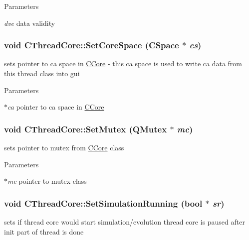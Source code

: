 \begin{DoxyParams}{Parameters}
\item[{\em dve}]data validity \end{DoxyParams}
\hypertarget{classCThreadCore_aebf817096243757f85c09221b9271c8d}{
\subsubsection[{SetCoreSpace}]{\setlength{\rightskip}{0pt plus 5cm}void CThreadCore::SetCoreSpace ({\bf CSpace} $\ast$ {\em cs})}}
\label{classCThreadCore_aebf817096243757f85c09221b9271c8d}
sets pointer to ca space in \hyperlink{classCCore}{CCore} -\/ this ca space is used to write ca data from this thread class into gui


\begin{DoxyParams}{Parameters}
\item[{\em $\ast$ca}]pointer to ca space in \hyperlink{classCCore}{CCore} \end{DoxyParams}
\hypertarget{classCThreadCore_ada7f488e5307d5996cea904f5fa9d62b}{
\subsubsection[{SetMutex}]{\setlength{\rightskip}{0pt plus 5cm}void CThreadCore::SetMutex (QMutex $\ast$ {\em mc})}}
\label{classCThreadCore_ada7f488e5307d5996cea904f5fa9d62b}
sets pointer to mutex from \hyperlink{classCCore}{CCore} class


\begin{DoxyParams}{Parameters}
\item[{\em $\ast$mc}]pointer to mutex class \end{DoxyParams}
\hypertarget{classCThreadCore_a001ae8aefae184bcb4274793a7633df6}{
\subsubsection[{SetSimulationRunning}]{\setlength{\rightskip}{0pt plus 5cm}void CThreadCore::SetSimulationRunning (bool $\ast$ {\em sr})}}
\label{classCThreadCore_a001ae8aefae184bcb4274793a7633df6}
sets if thread core would start simulation/evolution thread core is paused after init part of thread is done


